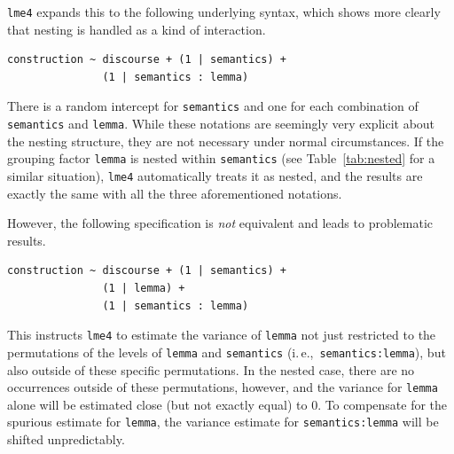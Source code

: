 \documentclass[a4paper,12pt]{article}
\newcommand{\ie}{i.\,e.,\ }
\begin{document}
\texttt{lme4} expands this to the following underlying syntax, which shows more clearly that nesting is handled as a kind of interaction.

\vspace{0.5\baselineskip}

\begin{lstlisting}
construction ~ discourse + (1 | semantics) +
               (1 | semantics : lemma)
\end{lstlisting}

There is a random intercept for \texttt{semantics} and one for each combination of \texttt{semantics} and \texttt{lemma}.
While these notations are seemingly very explicit about the nesting structure, they are not necessary under normal circumstances.
If the grouping factor \texttt{lemma} is nested within \texttt{semantics} (see Table~\ref{tab:nested} for a similar situation), \texttt{lme4} automatically treats it as nested, and the results are exactly the same with all the three aforementioned notations.

However, the following specification is \textit{not} equivalent and leads to problematic results.

\vspace{0.5\baselineskip}

\begin{lstlisting}
construction ~ discourse + (1 | semantics) +
               (1 | lemma) +
               (1 | semantics : lemma)
\end{lstlisting}

This instructs \texttt{lme4} to estimate the variance of \texttt{lemma} not just restricted to the permutations of the levels of \texttt{lemma} and \texttt{semantics} (\ie \texttt{semantics:lemma}), but also outside of these specific permutations.
In the nested case, there are no occurrences outside of these permutations, however, and the variance for \texttt{lemma} alone will be estimated close (but not exactly equal) to $0$.
To compensate for the spurious estimate for \texttt{lemma}, the variance estimate for \texttt{semantics:lemma} will be shifted unpredictably.
\end{document}

